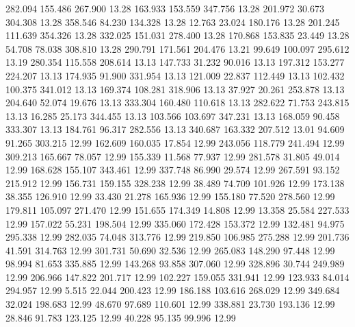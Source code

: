  282.094  155.486  267.900        13.28
 163.933  153.559  347.756        13.28
 201.972   30.673  304.308        13.28
 358.546   84.230  134.328        13.28
  12.763   23.024  180.176        13.28
 201.245  111.639  354.326        13.28
 332.025  151.031  278.400        13.28
 170.868  153.835   23.449        13.28
  54.708   78.038  308.810        13.28
 290.791  171.561  204.476        13.21
  99.649  100.097  295.612        13.19
 280.354  115.558  208.614        13.13
 147.733   31.232   90.016        13.13
 197.312  153.277  224.207        13.13
 174.935   91.900  331.954        13.13
 121.009   22.837  112.449        13.13
 102.432  100.375  341.012        13.13
 169.374  108.281  318.906        13.13
  37.927   20.261  253.878        13.13
 204.640   52.074   19.676        13.13
 333.304  160.480  110.618        13.13
 282.622   71.753  243.815        13.13
  16.285   25.173  344.455        13.13
 103.566  103.697  347.231        13.13
 168.059   90.458  333.307        13.13
 184.761   96.317  282.556        13.13
 340.687  163.332  207.512        13.01
  94.609   91.265  303.215        12.99
 162.609  160.035   17.854        12.99
 243.056  118.779  241.494        12.99
 309.213  165.667   78.057        12.99
 155.339   11.568   77.937        12.99
 281.578   31.805   49.014        12.99
 168.628  155.107  343.461        12.99
 337.748   86.990   29.574        12.99
 267.591   93.152  215.912        12.99
 156.731  159.155  328.238        12.99
  38.489   74.709  101.926        12.99
 173.138   38.355  126.910        12.99
  33.430   21.278  165.936        12.99
 155.180   77.520  278.560        12.99
 179.811  105.097  271.470        12.99
 151.655  174.349   14.808        12.99
  13.358   25.584  227.533        12.99
 157.022   55.231  198.504        12.99
 335.060  172.428  153.372        12.99
 132.481   94.975  295.338        12.99
 282.035   74.048  313.776        12.99
 219.850  106.985  275.288        12.99
 201.736   41.591  314.763        12.99
 301.731   50.690   32.536        12.99
 265.083  148.290   97.448        12.99
  98.994   81.653  335.885        12.99
 143.268   93.858  307.060        12.99
 328.896   30.744  249.989        12.99
 206.966  147.822  201.717        12.99
 102.227  159.055  331.941        12.99
 123.933   84.014  294.957        12.99
   5.515   22.044  200.423        12.99
 186.188  103.616  268.029        12.99
 349.684   32.024  198.683        12.99
  48.670   97.689  110.601        12.99
 338.881   23.730  193.136        12.99
  28.846   91.783  123.125        12.99
  40.228   95.135   99.996        12.99
